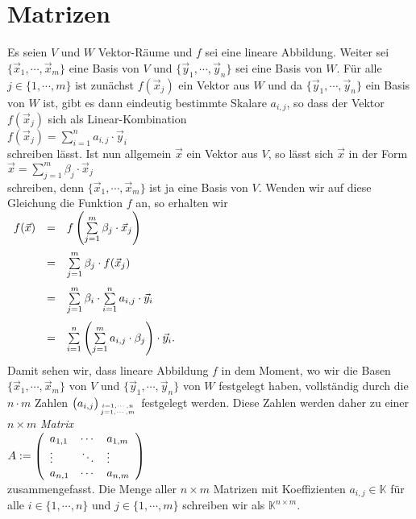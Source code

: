 \section{Matrizen}
Es seien $V$ und $W$ Vektor-R\"{a}ume und $f$ sei eine lineare Abbildung.  Weiter sei
$\{ \vec{x}_1, \cdots, \vec{x}_m \}$ eine Basis von $V$ und 
$\{ \vec{y}_1, \cdots, \vec{y}_n \}$ sei eine Basis von $W$.  F\"{u}r alle $j \in \{1,\cdots,m\}$ ist zun\"{a}chst
$f(\vec{x}_j)$ ein Vektor aus $W$ und da $\{ \vec{y}_1, \cdots, \vec{y}_n \}$ ein Basis von $W$ ist, 
gibt es dann eindeutig bestimmte Skalare $a_{i,j}$, so dass der Vektor $f(\vec{x}_j)$ sich als
Linear-Kombination 
\\[0.2cm]
\hspace*{1.3cm}
$f(\vec{x}_j) = \sum\limits_{i=1}^n a_{i,j} \cdot \vec{y}_i$
\\[0.2cm]
schreiben l\"{a}sst.  Ist nun allgemein $\vec{x}$ ein Vektor aus $V$, so l\"{a}sst sich $\vec{x}$ in der Form 
\\[0.2cm]
\hspace*{1.3cm}
$\vec{x} = \sum\limits_{j=1}^m \beta_j \cdot \vec{x}_j$
\\[0.2cm]
schreiben, denn $\{ \vec{x}_1, \cdots, \vec{x}_m \}$ ist ja eine Basis von $V$.  Wenden wir auf diese Gleichung die Funktion $f$ an, 
so erhalten wir
\\[0.2cm]
\hspace*{1.3cm}
$
\begin{array}[t]{lcl}
  f(\vec{x}) & = & f\left(\sum\limits_{j=1}^m \beta_j \cdot \vec{x}_j\right)                    \\[0.5cm]
                & = & \sum\limits_{j=1}^m \beta_j \cdot f(\vec{x}_j)                               \\[0.5cm]
                & = & \sum\limits_{j=1}^m \beta_i \cdot \sum\limits_{i=1}^n a_{i,j} \cdot \vec{y}_i \\[0.5cm]
                & = &  \sum\limits_{i=1}^n \left(\sum\limits_{j=1}^m a_{i,j} \cdot \beta_j\right) \cdot \vec{y}_i. \\[0.5cm]
\end{array}
$
\\[0.2cm]
Damit sehen wir, dass lineare Abbildung $f$ in dem Moment, wo wir die Basen
$\{ \vec{x}_1, \cdots, \vec{x}_m \}$ von $V$ und $\{ \vec{y}_1, \cdots, \vec{y}_n \}$ von $W$
festgelegt haben, vollst\"{a}ndig durch die $n \cdot m$ Zahlen $\bigl(a_{i,j}\bigr)_{i=1,\cdots,n \atop j=1,\cdots,m}$ festgelegt werden.  Diese Zahlen werden 
daher zu einer $n \times m$ \emph{Matrix}
\\[0.2cm]
\hspace*{1.3cm}
$A := \left(
      \begin{array}[c]{lcl}
      a_{1,1} & \cdots & a_{1,m} \\
      \vdots & \ddots & \vdots \\
      a_{n,1} & \cdots & a_{n,m} \\
      \end{array}
      \right)
$
\\[0.2cm]
zusammengefasst.  Die Menge aller $n \times m$ Matrizen mit Koeffizienten $a_{i,j} \in \mathbb{K}$
f\"{u}r alle $i \in \{1,\cdots,n\}$ und $j \in \{1,\cdots,m\}$ schreiben wir als $\mathbb{K}^{n \times
  m}$.

